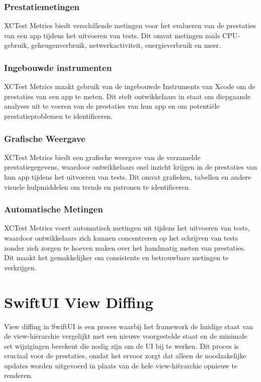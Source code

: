 \subsubsection{Prestatiemetingen}
XCTest Metrics biedt verschillende metingen voor het evalueren van de prestaties van een app tijdens het uitvoeren van tests. Dit omvat metingen zoals CPU-gebruik, geheugenverbruik, netwerkactiviteit, energieverbruik en meer.
\subsubsection{Ingebouwde instrumenten}
XCTest Metrics maakt gebruik van de ingebouwde Instruments van Xcode om de prestaties van een app te meten. Dit stelt ontwikkelaars in staat om diepgaande analyses uit te voeren van de prestaties van hun app en om potentiële prestatieproblemen te identificeren.
\subsubsection{Grafische Weergave}
XCTest Metrics biedt een grafische weergave van de verzamelde prestatiegegevens, waardoor ontwikkelaars snel inzicht krijgen in de prestaties van hun app tijdens het uitvoeren van tests. Dit omvat grafieken, tabellen en andere visuele hulpmiddelen om trends en patronen te identificeren.
\subsubsection{Automatische Metingen}
XCTest Metrics voert automatisch metingen uit tijdens het uitvoeren van tests, waardoor ontwikkelaars zich kunnen concentreren op het schrijven van tests zonder zich zorgen te hoeven maken over het handmatig meten van prestaties. Dit maakt het gemakkelijker om consistente en betrouwbare metingen te verkrijgen.

\section{SwiftUI View Diffing}

View diffing in SwiftUI is een proces waarbij het framework de huidige staat van de view-hiërarchie vergelijkt met een nieuwe voorgestelde staat en de minimale set wijzigingen berekent die nodig zijn om de UI bij te werken\autocite{ViewDiffing}. Dit proces is cruciaal voor de prestaties, omdat het ervoor zorgt dat alleen de noodzakelijke updates worden uitgevoerd in plaats van de hele view-hiërarchie opnieuw te renderen.

